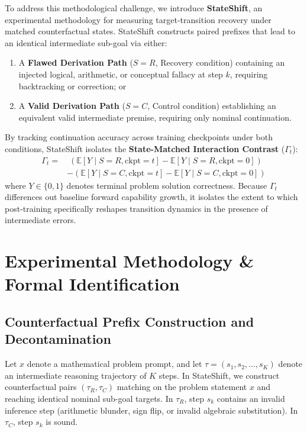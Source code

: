 \documentclass[11pt]{article}
\begin{document}
To address this methodological challenge, we introduce \textbf{StateShift}, an experimental methodology for measuring target-transition recovery under matched counterfactual states. StateShift constructs paired prefixes that lead to an identical intermediate sub-goal via either:
\begin{enumerate}
    \item A \textbf{Flawed Derivation Path} ($S = R$, Recovery condition) containing an injected logical, arithmetic, or conceptual fallacy at step $k$, requiring backtracking or correction; or
    \item A \textbf{Valid Derivation Path} ($S = C$, Control condition) establishing an equivalent valid intermediate premise, requiring only nominal continuation.
\end{enumerate}

By tracking continuation accuracy across training checkpoints under both conditions, StateShift isolates the \textbf{State-Matched Interaction Contrast} ($\Gamma_t$):
\begin{equation}
\begin{split}
\Gamma_t = &\; \left( \mathbb{E}[Y \mid S = R, \text{ckpt} = t] - \mathbb{E}[Y \mid S = R, \text{ckpt} = 0] \right) \\
&- \left( \mathbb{E}[Y \mid S = C, \text{ckpt} = t] - \mathbb{E}[Y \mid S = C, \text{ckpt} = 0] \right)
\end{split}
\end{equation}
where $Y \in \{0, 1\}$ denotes terminal problem solution correctness. Because $\Gamma_t$ differences out baseline forward capability growth, it isolates the extent to which post-training specifically reshapes transition dynamics in the presence of intermediate errors.

\section{Experimental Methodology \& Formal Identification}
\label{sec:methodology}

\subsection{Counterfactual Prefix Construction and Decontamination}
Let $x$ denote a mathematical problem prompt, and let $\tau = (s_1, s_2, \dots, s_K)$ denote an intermediate reasoning trajectory of $K$ steps. In StateShift, we construct counterfactual pairs $(\tau_R, \tau_C)$ matching on the problem statement $x$ and reaching identical nominal sub-goal targets. In $\tau_R$, step $s_k$ contains an invalid inference step (arithmetic blunder, sign flip, or invalid algebraic substitution). In $\tau_C$, step $s_k$ is sound.
\end{document}
